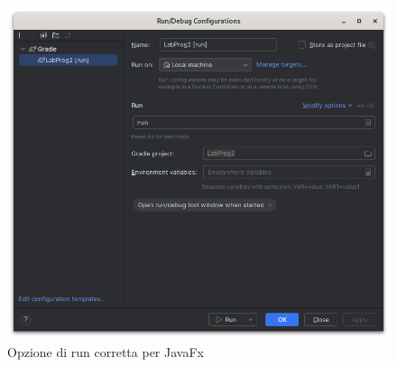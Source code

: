         \begin{figure}[H]
            \centering
            \graphicspath{{src/capitoli/05/img/}}
            \includegraphics[width=\textwidth]{run_config.png}
            \caption{Opzione di run corretta per JavaFx}
            \label{fig:Opzione di run corretta per JavaFx}
        \end{figure}
    
